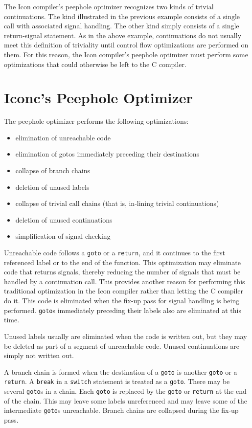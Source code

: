 The Icon compiler's peephole optimizer recognizes two kinds of trivial
continuations. The kind illustrated in the previous example consists
of a single call with associated signal handling. The other kind
simply consists of a single return-signal statement. As in the above
example, continuations do not usually meet this definition of
triviality until control flow optimizations are performed on them. For
this reason, the Icon compiler's peephole optimizer must perform some
optimizations that could otherwise be left to the C compiler.


\section{Iconc's Peephole Optimizer}

The peephole optimizer performs the following optimizations: 

\liststyleLxxxiv
\begin{itemize}
\item 
elimination of unreachable code 
\item 
elimination of gotos immediately preceding their destinations 
\item 
collapse of branch chains 
\item 
deletion of unused labels 
\item 
collapse of trivial call chains (that is, in-lining trivial continuations) 
\item 
deletion of unused continuations 
\item 
simplification of signal checking 
\end{itemize}

Unreachable code follows a \texttt{goto} or a \texttt{return}, and it
continues to the first referenced label or to the end of the function.
This optimization may eliminate code that returns signals, thereby
reducing the number of signals that must be handled by a continuation
call. This provides another reason for performing this traditional
optimization in the Icon compiler rather than letting the C compiler
do it. This code is eliminated when the fix-up pass for signal
handling is being performed. \texttt{goto}s immediately preceding their labels
also are eliminated at this time.

Unused labels usually are eliminated when the code is written out, but
they may be deleted as part of a segment of unreachable code. Unused
continuations are simply not written out.

A branch chain is formed when the destination of a \texttt{goto} is
another \texttt{goto} or a \texttt{return}. A \texttt{break} in a
\texttt{switch} statement is treated as a \texttt{goto}. There may be
several \texttt{goto}s in a chain. Each \texttt{goto} is replaced by
the \texttt{goto} or \texttt{return} at the end of the chain. This may
leave some labels unreferenced and may leave some of the intermediate
\texttt{goto}s unreachable. Branch chains are collapsed during the
fix-up pass.

